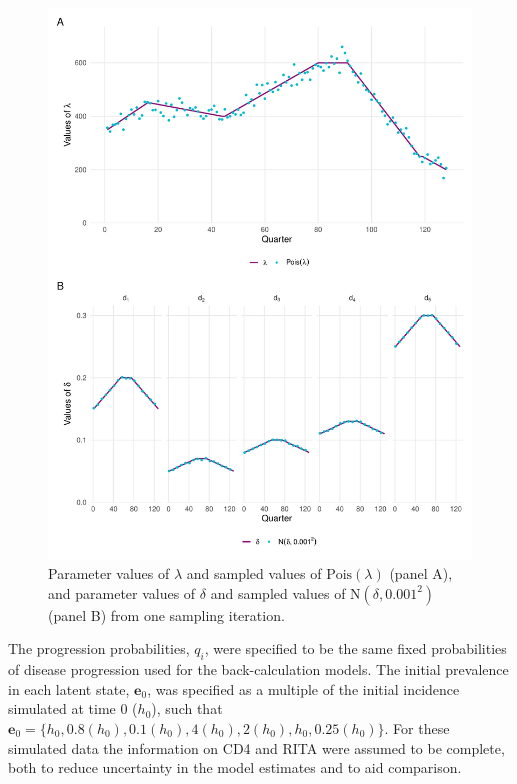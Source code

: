 \begin{figure}[htbp!]
  \centering
  \includegraphics[width=\textwidth]{lambda_sim.pdf}
  \caption[Parameter values and sampled values of HIV incidence and HIV diagnosis probabilities from one sampling iteration]{Parameter values of $\lambda$ and sampled values of $\text{Pois}(\lambda)$ (panel A), and parameter values of $\delta$ and sampled values of $\text{N}(\delta, 0.001^2)$ (panel B) from one sampling iteration.}\label{fig:lambda_sim}
\end{figure}

The progression probabilities, $q_i$, were specified to be the same fixed probabilities of disease progression used for the back-calculation models. The initial prevalence in each latent state, $\bm{e}_0$, was specified as a multiple of the initial incidence simulated at time 0 ($h_0$), such that $\bm{e}_0= \{h_0, 0.8(h_0), 0.1(h_0), 4(h_0), 2(h_0), h_0, 0.25(h_0)\}$. For these simulated data the information on CD4 and RITA were assumed to be complete, both to reduce uncertainty in the model estimates and to aid comparison.

